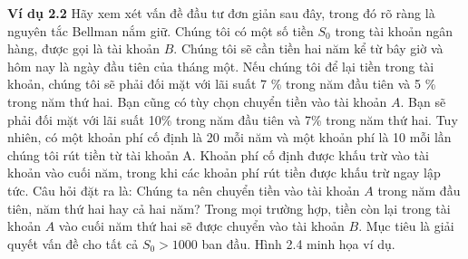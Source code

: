 \documentclass[12pt,a4paper]{report}
\begin{document}
		\textbf{Ví dụ 2.2} Hãy xem xét vấn đề đầu tư đơn giản sau đây, trong đó rõ ràng là nguyên tắc Bellman nắm giữ. Chúng tôi có một số tiền $S_0$ trong tài khoản ngân hàng, được gọi là tài khoản $B$. Chúng tôi sẽ cần tiền hai năm kể từ bây giờ và hôm nay là ngày đầu tiên của tháng một. Nếu chúng tôi để lại tiền trong tài khoản, chúng tôi sẽ phải đối mặt với lãi suất 7 \% trong năm đầu tiên và 5 \% trong năm thứ hai. Bạn cũng có tùy chọn chuyển tiền vào tài khoản $A$. Bạn sẽ phải đối mặt với lãi suất 10\% trong năm đầu tiên và 7\% trong năm thứ hai. Tuy nhiên, có một khoản phí cố định là 20 mỗi năm và một khoản phí là 10 mỗi lần chúng tôi rút tiền từ tài khoản A. Khoản phí cố định được khấu trừ vào tài khoản vào cuối năm, trong khi các khoản phí rút tiền được khấu trừ ngay lập tức. Câu hỏi đặt ra là: Chúng ta nên chuyển tiền vào tài khoản $A$ trong năm đầu tiên, năm thứ hai hay cả hai năm? Trong mọi trường hợp, tiền còn lại trong tài khoản $A$ vào cuối năm thứ hai sẽ được chuyển vào tài khoản $B$. Mục tiêu là giải quyết vấn đề cho tất cả $S_0> 1000$ ban đầu. Hình 2.4 minh họa ví dụ.
		
\end{document}
